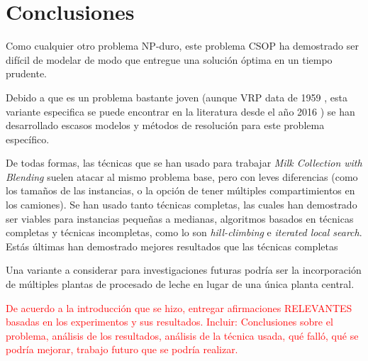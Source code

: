 \section{Conclusiones}

Como cualquier otro problema NP-duro, este problema CSOP ha demostrado ser difícil de modelar de modo que entregue una solución óptima en un tiempo prudente.

Debido a que es un problema bastante joven (aunque VRP data de 1959 \cite{TruckDispatchingProblem}, esta variante especifica se puede encontrar en la literatura desde el año 2016 \cite{MilkWithBlending}) se han desarrollado escasos modelos y métodos de resolución para este problema específico.

De todas formas, las técnicas que se han usado para trabajar \textit{Milk Collection with Blending} suelen atacar al mismo problema base, pero con leves diferencias (como los tamaños de las instancias, o la opción de tener múltiples compartimientos en los camiones). Se han usado tanto técnicas completas, las cuales han demostrado ser viables para instancias pequeñas a medianas, algoritmos basados en técnicas completas y técnicas incompletas, como lo son \textit{hill-climbing} e \textit{iterated local search}. Estás últimas han demostrado mejores resultados que las técnicas completas

Una variante a considerar para investigaciones futuras podría ser la incorporación de múltiples plantas de procesado de leche en lugar de una única planta central.



\textcolor{red}{De acuerdo a la introducción que se hizo, entregar afirmaciones RELEVANTES basadas en los experimentos y sus resultados. Incluir: Conclusiones sobre el problema, análisis de los resultados, análisis de la técnica usada, qué falló, qué se podría mejorar, trabajo futuro que se podría realizar.}


